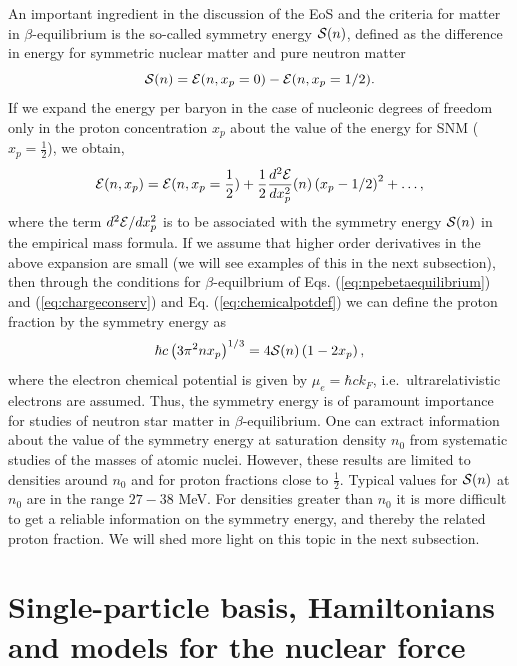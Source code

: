 An important ingredient in the discussion of the EoS and the criteria for
matter in $\beta$-equilibrium is the so-called symmetry energy ${\cal S} (n)$, 
defined as
the difference in energy for symmetric nuclear matter
and pure neutron matter 
\begin{equation}
      {\cal S} (n) = {\cal E} (n,x_p=0) - {\cal E} (n,x_p=1/2 ).
      \label{eq:symenergy}
\end{equation}
If we expand the energy per baryon in the case of nucleonic degrees of freedom 
only
in the proton concentration $x_p$ about the value of the energy 
for SNM ($x_p=\frac{1}{2}$), we obtain,
\begin{equation}
     {\cal E} (n,x_p)={\cal E} (n,x_p=\frac{1}{2})+
     \frac{1}{2}\frac{d^2 {\cal E}}{dx_p^2} (n)\left(x_p-1/2\right)^2+\dots ,
     \label{eq:energyexpansion}
\end{equation}
where the term $d^2 {\cal E}/dx_p^2$ 
is to be associated with the symmetry energy ${\cal S} (n)$ in the empirical
mass formula. If
we assume that higher order derivatives in the above expansion are small
(we will see examples of this in the next subsection), then through the 
conditions
for $\beta$-equilbrium of Eqs. (\ref{eq:npebetaequilibrium}) and 
(\ref{eq:chargeconserv})
and Eq. (\ref{eq:chemicalpotdef}) we can define the proton
fraction by the symmetry energy as
\begin{equation}  
    \hbar c\left(3\pi^2nx_p\right)^{1/3} = 4{\cal S} (n)\left(1-2x_p\right),
    \label{eq:crudeprotonfraction}
\end{equation}
where the electron chemical potential is given
by $\mu_e = \hbar c k_F$, i.e.\  ultrarelativistic electrons are assumed.
Thus, the symmetry energy is of paramount importance for studies 
of neutron star matter in $\beta$-equilibrium.
One can extract information about the value of the symmetry energy at saturation 
density
$n_0$ from systematic studies of the masses of atomic nuclei. However, these 
results
are limited to densities around $n_0$ and for proton fractions close to 
$\frac{1}{2}$.
Typical values for ${\cal S} (n)$ at $n_0$ are in the range $27-38$ MeV.
For densities greater than $n_0$ it is more difficult to get a reliable 
information on the symmetry energy, and thereby the related proton fraction.
We will shed more light on this topic in the next subsection.





\section{Single-particle basis, Hamiltonians and models for the nuclear force}

